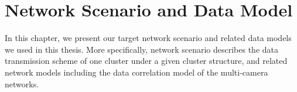 \section{Network Scenario and Data Model}
\label{sec::scenarioAndModel}
In this chapter, we present our target network scenario and related data models we used in this thesis.
More specifically, network scenario describes the data transmission scheme of one cluster under a given cluster structure, and related network models including the data correlation model of the multi-camera networks.


